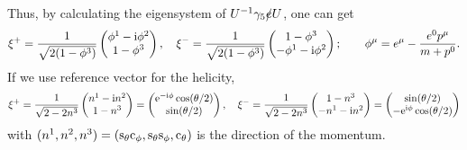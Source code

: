 \documentclass{CheatSheet}
\begin{document}
Thus, by calculating the eigensystem of $U^{-1}\gamma_5\slashed {e} U$, one can get
\begin{equation}
 \xi^+ = \frac{1}{\sqrt{2(1-\phi^3)}}\begin{pmatrix}\phi^1-{\mathrm{i}} \phi^2 \\ 1-\phi^3\end{pmatrix},\quad
 \xi^- = \frac{1}{\sqrt{2(1-\phi^3)}}\begin{pmatrix}1-\phi^3\\-\phi^1-{\mathrm{i}} \phi^2\end{pmatrix};\qquad
 \phi^\mu = e^\mu-\frac{e^0p^\mu}{m+p^0}.
\end{equation}
If we use reference vector for the helicity, 
\begin{equation}
 \xi^+ = \frac1{\sqrt{2-2n^3}}\begin{pmatrix}n^1-{\mathrm{i}} n^2\\1-n^3\end{pmatrix}
       =\begin{pmatrix}{\mathrm{e}}^{-{\mathrm{i}}\phi}\cos(\theta/2)\\\sin(\theta/2)\end{pmatrix},\quad
 \xi^- = \frac1{\sqrt{2-2n^3}}\begin{pmatrix}1-n^3\\-n^1-{\mathrm{i}} n^2\end{pmatrix}
       =\begin{pmatrix}\sin(\theta/2)\\-{\mathrm{e}}^{{\mathrm{i}}\phi}\cos(\theta/2)\end{pmatrix}
\end{equation}
with $(n^1,n^2,n^3)=(\mathrm{s}_{\theta}\mathrm{c}_{\phi},\mathrm{s}_{\theta}\mathrm{s}_{\phi},\mathrm{c}_{\theta})$ is the direction of the momentum.



\end{document}
